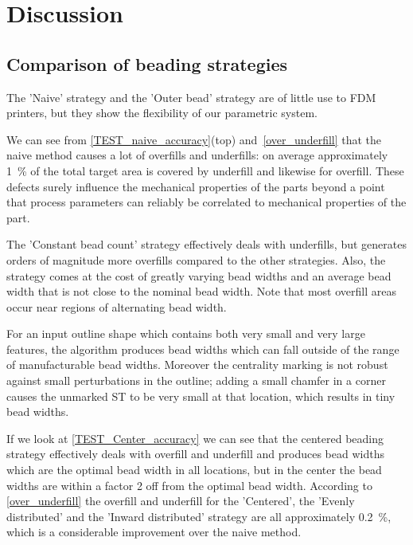 \section{Discussion}


\subsection{Comparison of beading strategies}
The 'Naive' strategy and the 'Outer bead' strategy are of little use to FDM printers, but they show the flexibility of our parametric system.

We can see from \cref{TEST_naive_accuracy}(top) and~\ref{over_underfill} that the naive method causes a lot of overfills and underfills: on average approximately \SI{1}{\percent} of the total target area is covered by underfill and likewise for overfill.
These defects surely influence the mechanical properties of the parts beyond a point that process parameters can reliably be correlated to mechanical properties of the part.


The 'Constant bead count' strategy effectively deals with underfills, but generates orders of magnitude more overfills compared to the other strategies. 
Also, the strategy comes at the cost of greatly varying bead widths and an average bead width that is not close to the nominal bead width.
Note that most overfill areas occur near regions of alternating bead width. 

For an input outline shape which contains both very small and very large features, the algorithm produces bead widths which can fall outside of the range of manufacturable bead widths.
Moreover the centrality marking is not robust against small perturbations in the outline; adding a small chamfer in a corner causes the unmarked ST to be very small at that location, which results in tiny bead widths.

If we look at \cref{TEST_Center_accuracy} we can see that
the centered beading strategy effectively deals with overfill and underfill and produces bead widths which are the optimal bead width in all locations, but in the center the bead widths are within a factor 2 off from the optimal bead width.
According to \cref{over_underfill} the overfill and underfill for the 'Centered', the 'Evenly distributed' and the 'Inward distributed' strategy are all approximately \SI{0.2}{\percent}, which is a considerable improvement over the naive method.

